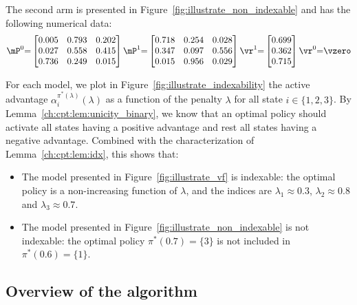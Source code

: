 The second arm is presented in Figure~\ref{fig:illustrate_non_indexable} and has the following numerical data:
\begin{equation}
    \label{eq:exemple_non_idexable}
    \mP^0{=}\begin{bmatrix}
        0.005 & 0.793 & 0.202 \\
        0.027 & 0.558 & 0.415 \\
        0.736 & 0.249 & 0.015
    \end{bmatrix}
    \mP^1{=}\begin{bmatrix}
        0.718 & 0.254 & 0.028 \\
        0.347 & 0.097 & 0.556 \\
        0.015 & 0.956 & 0.029
    \end{bmatrix}
    \vr^1{=}\begin{bmatrix}
        0.699 \\
        0.362 \\
        0.715
    \end{bmatrix} \vr^0{=}\vzero
\end{equation}

For each model, we plot in Figure~\ref{fig:illustrate_indexability} the active advantage $\alpha^{\pi^*(\lambda)}_i(\lambda)$ as a function of the penalty $\lambda$ for all state $i\in\{1,2,3\}$.
By Lemma~\ref{ch:cpt:lem:unicity_binary}, we know that an optimal policy should activate all states having a positive advantage and rest all states having a negative advantage.
Combined with the characterization of Lemma~\ref{ch:cpt:lem:idx}, this shows that:
\begin{itemize}
    \item The model presented in Figure~\ref{fig:illustrate_vf} is indexable: the optimal policy is a non-increasing function of $\lambda$, and the indices are $\lambda_1\approx0.3$, $\lambda_2\approx0.8$ and $\lambda_3\approx0.7$.
    \item The model presented in Figure~\ref{fig:illustrate_non_indexable} is not indexable: the optimal policy $\pi^*(0.7)=\{3\}$ is not included in $\pi^*(0.6)=\{1\}$. 
\end{itemize}

\subsection{Overview of the algorithm}
\label{ssec:informal_widx_algo}

